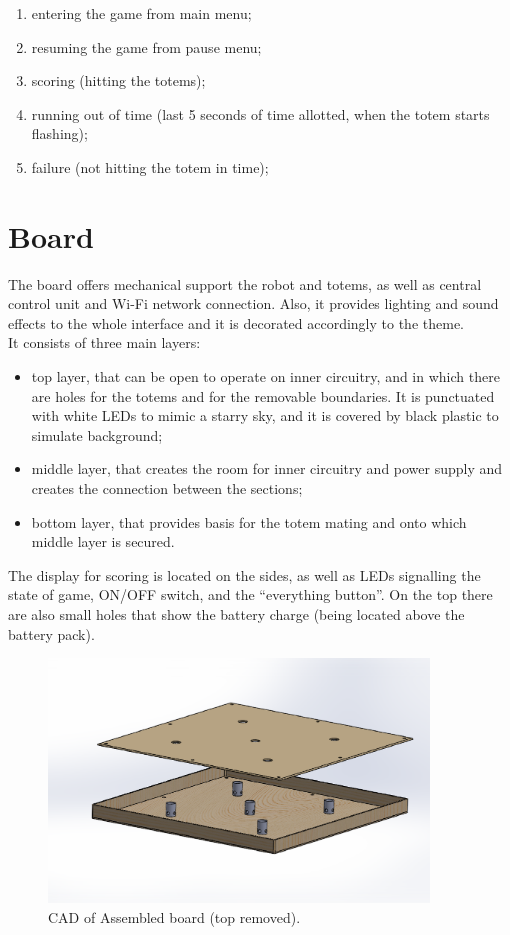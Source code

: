 \documentclass[a4paper,twoside]{book}
\begin{document}
\begin{enumerate}
\item entering the game from main menu;
\item resuming the game from pause menu;
\item scoring (hitting the totems);
\item running out of time (last 5 seconds of time allotted, when the totem starts flashing);
\item failure (not hitting the totem in time);
\end{enumerate}


\section{Board}

The board offers mechanical support the robot and totems, as well as central control unit and Wi-Fi network connection. Also, it provides lighting and sound effects to the whole interface and it is decorated accordingly to the theme.
\\
It consists of three main layers:

\begin{itemize}
\item top layer, that can be open to operate on inner circuitry, and in which there are holes for the totems and for the removable boundaries. It is punctuated with white LEDs to mimic a starry sky, and it is covered by black plastic to simulate background;
\item middle layer, that creates the room for inner circuitry and power supply and creates the connection between the sections;
\item bottom layer, that provides basis for the totem mating and onto which middle layer is secured.
\end{itemize}
The display for scoring is located on the sides, as well as LEDs signalling the state of game, ON/OFF switch, and the \textquotedblleft everything button\textquotedblright. On the top there are also small holes that show the battery charge (being located above the battery pack).


\begin{figure}
\centering 
\includegraphics[width=0.9\textwidth]{img/BoardVistaInsieme3.eps}
\caption{CAD of Assembled board (top removed).}
\end{figure}
\end{document}
